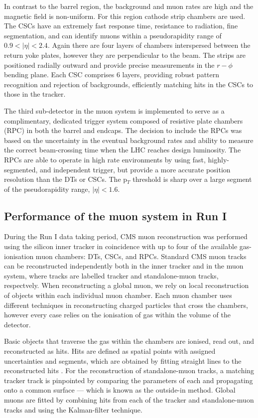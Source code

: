 In contrast to the barrel region, the background and muon rates are high and the magnetic field is non-uniform. For this region cathode strip chambers are used. The CSCs have an extremely fast response time, resistance to radiation, fine segmentation, and can identify muons within a pseudorapidity range of $0.9 < |\eta| < 2.4$. Again there are four layers of chambers interspersed between the return yoke plates, however they are perpendicular to the beam. The strips are positioned radially outward and provide precise measurements in the $r-\phi$ bending plane. Each CSC comprises 6 layers, providing robust pattern recognition and rejection of backgrounds, efficiently matching hits in the CSCs to those in the tracker.

The third sub-detector in the muon system is implemented to serve as a complimentary, dedicated trigger system composed of resistive plate chambers (RPC) in both the barrel and endcaps. The decision to include the RPCs was based on the uncertainty in the eventual background rates and ability to measure the correct beam-crossing time when the LHC reaches design luminosity. The RPCs are able to operate in high rate environments by using fast, highly-segmented, and independent trigger, but provide a more accurate position resolution than the DTs or CSCs. The p$_T$ threshold is sharp over a large segment of the pseudorapidity range, $|\eta|<1.6$. 

\subsection{Performance of the muon system in Run I} \label{subsec-MuonSystemPerformance}

During the Run I data taking period, CMS muon reconstruction was performed using the silicon inner tracker in coincidence with up to four of the available gas-ionisation muon chambers: DTs, CSCs, and RPCs. Standard CMS muon tracks can be reconstructed independently both in the inner tracker and in the muon system, where tracks are labelled tracker and standalone-muon tracks, respectvely. When reconstructing a global muon, we rely on local reconstruction of objects within each individual muon chamber. Each muon chamber uses different techniques in reconstructing charged particles that cross the chambers, however every case relies on the ionisation of gas within the volume of the detector.  

Basic objects that traverse the gas within the chambers are ionised, read out, and reconstructed as hits. Hits are defined as spatial points with assigned uncertainties and segments, which are obtained by fitting straight lines to the reconstructed hits \cite{Chatrchyan:2013sba}. For the reconstruction of standalone-muon tracks, a matching tracker track is pinpointed by comparing the parameters of each and propagating onto a common surface --- which is known as the outside-in method. Global muons are fitted by combining hits from each of the tracker and standalone-muon tracks and using the Kalman-filter technique. 

